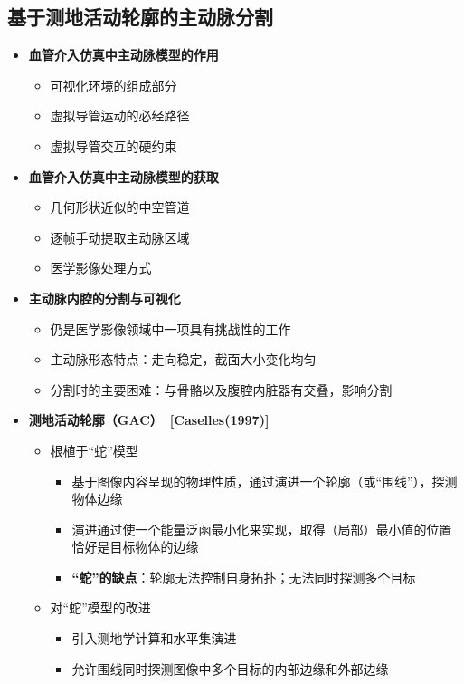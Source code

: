 \subsection[主动脉分割]{基于测地活动轮廓的主动脉分割}

\begin{frame}
\begin{itemize}
\item \textbf{血管介入仿真中主动脉模型的作用}
\begin{itemize}
\item 可视化环境的组成部分
\item 虚拟导管运动的必经路径
\item 虚拟导管交互的硬约束
\end{itemize}
\pause \item \textbf{血管介入仿真中主动脉模型的获取}
\begin{itemize}
\item 几何形状近似的中空管道
\item 逐帧手动提取主动脉区域
\item 医学影像处理方式
\end{itemize}
\pause \item \textbf{主动脉内腔的分割与可视化}
\begin{itemize}
\item 仍是医学影像领域中一项具有挑战性的工作
\item 主动脉形态特点：走向稳定，截面大小变化均匀
\item 分割时的主要困难：与骨骼以及腹腔内脏器有交叠，影响分割
\end{itemize}
\end{itemize}
\end{frame} 

\begin{frame}
\begin{itemize}
\item \textbf{测地活动轮廓（GAC）~[Caselles(1997)]}
\begin{itemize}
\pause \item 根植于“蛇”模型
\begin{itemize}
\item 基于图像内容呈现的物理性质，通过演进一个轮廓（或“围线”），探测物体边缘
\item 演进通过使一个能量泛函最小化来实现，取得（局部）最小值的位置恰好是目标物体的边缘
\item \textbf{“蛇”的缺点}：轮廓无法控制自身拓扑；无法同时探测多个目标
\end{itemize}
\pause \item 对“蛇”模型的改进
\begin{itemize}
\item 引入测地学计算和水平集演进
\item 允许围线同时探测图像中多个目标的内部边缘和外部边缘
\end{itemize}
\end{itemize}
\end{itemize}
\end{frame}

